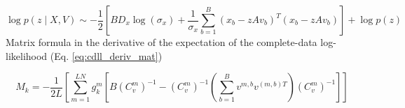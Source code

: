 \documentclass{paper}
\begin{document}
\begin{equation} 
\log p(z \mid X,V) \sim -\frac{1}{2} \left[B D_x\log(\sigma_x) + \frac{1}{\sigma_x} \sum_{b=1}^B (x_b - zAv_b)^T (x_b - zAv_b)\right] + \log p(z)
\end{equation}
Matrix formula in the derivative of the expectation of the complete-data log-likelihood (Eq. \ref{eq:cdll_deriv_mat})

\begin{equation}
M_k = -\frac{1}{2L} \left[ \sum_{m=1}^{LN} g_k^{m} \left[ B \left( C_v^m \right)^{-1} -  \left( C_v^m \right)^{-1} \left( \sum_{b=1}^B v^{m,b} v^{(m,b)T} \right) \left( C_v^m \right)^{-1} \right]\right]
\end{equation}
\end{document}
